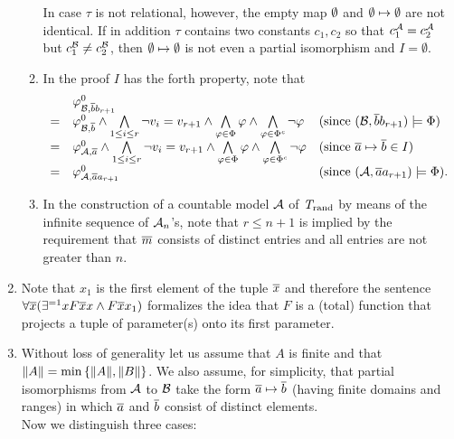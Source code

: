 \begin{enumerate}[1.]
\begin{enumerate}[(1)]
In case $\tau$ is not relational, however, the empty map $\emptyset$ and $\emptyset \mapsto \emptyset$ are not identical. If in addition $\tau$ contains two constants $c_1, c_2$ so that $c_1^{\mathcal{A}} = c_2^{\mathcal{A}}$ but $c_1^{\mathcal{B}} \neq c_2^{\mathcal{B}}$, then $\emptyset \mapsto \emptyset$ is not even a partial isomorphism and $I = \emptyset$.
\item In the proof $I$ has the forth property, note that
\[
\begin{array}{lll}
\ & \hint{0}{\strct{B}, \vect{b}b_{r + 1}} & \cr
= & \hint{0}{\strct{B}, \vect{b}} \land \bland\limits_{1 \leq i \leq r} \neg v_i = v_{r + 1} \land \bland\limits_{\varphi \in \Phi} \varphi \land \bland\limits_{\varphi \in \cmpl{\Phi}} \neg\varphi & \text{(since \mathmode{(\strct{B}, \vect{b}b_{r + 1}) \satis \Phi})} \cr
= & \hint{0}{\strct{A}, \vect{a}} \land \bland\limits_{1 \leq i \leq r} \neg v_i = v_{r + 1}\land \bland\limits_{\varphi \in \Phi} \varphi \land \bland\limits_{\varphi \in \cmpl{\Phi}} \neg\varphi & \text{(since \mathmode{\vect{a} \mapsto \vect{b} \in I})} \cr
= & \hint{0}{\strct{A}, \vect{a}a_{r + 1}} & \text{(since \mathmode{(\strct{A}, \vect{a}a_{r + 1}) \satis \Phi})}. \cr
\end{array}
\]
\item In the construction of a countable model $\mathcal{A}$ of $\mathit{T}_{\mathrm{rand}}$ by means of the infinite sequence of $\mathcal{A}_n$'s, note that $r \leq n + 1$ is implied by the requirement that $\overline{m}$ consists of distinct entries and all entries are not greater than $n$.
\end{enumerate}
%
\item {} Note that $x_1$ is the first element of the tuple $\overline{x}$ and therefore the sentence $\forall \overline{x} (\exists^{= 1}x F\overline{x}x \land F\overline{x}x_1)$ formalizes the idea that $F$ is a (total) function that projects a tuple of parameter(s) onto its first parameter.
%
\item {} Without loss of generality let us assume that $A$ is finite and that $\|A\| = \min{\{\|A\|, \|B\|\}}$. We also assume, for simplicity, that partial isomorphisms from $\mathcal{A}$ to $\mathcal{B}$ take the form $\overline{a} \mapsto \overline{b}$ (having finite domains and ranges) in which $\overline{a}$ and $\overline{b}$ consist of distinct elements.
\medskip\\
Now we distinguish three cases:
\begin{enumerate}[(1)]

\end{enumerate}
\end{enumerate}
